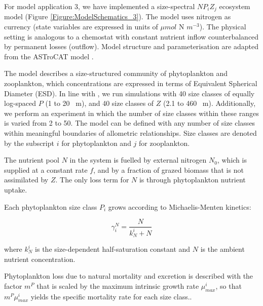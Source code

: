\documentclass[journal abbreviation, manuscript]{copernicus}
\begin{document}
For model application 3, we have implemented a size-spectral $NP_{i}Z_{j}$ ecosystem model (Figure \ref{Figure:ModelSchematics_3}). The model uses nitrogen as currency (state variables are expressed in units of $\mu mol$ N $m^{-3}$). The physical setting is analogous to a chemostat with constant nutrient inflow counterbalanced by permanent losses (outflow). Model structure and parameterisation are adapted from the ASTroCAT model \citep{Banas2011b}.

The model describes a size-structured community of phytoplankton and zooplankton, which concentrations are expressed in terms of Equivalent Spherical Diameter (ESD). In line with \citet{Banas2011b}, we run simulations with 40 size classes of equally log-spaced $P$ (1 to 20 \unit{\mu m}), and 40 size classes of $Z$ (2.1 to 460  \unit{\mu m}). Additionally, we perform an experiment in which the number of size classes within these ranges is varied from 2 to 50. The model can be defined with any number of size classes within meaningful boundaries of allometric relationships. Size classes are denoted by the subscript $i$ for phytoplankton and $j$ for zooplankton.

The nutrient pool $N$ in the system is fuelled by external nitrogen $N_0$, which is supplied at a constant rate $f$, and by a fraction of grazed biomass that is not assimilated by $Z$. The only loss term for $N$ is through phytoplankton nutrient uptake.

Each phytoplankton size class $P_i$ grows according to Michaelis-Menten kinetics:

\begin{equation}
    \gamma_i^N =  \frac{N}{k_N^i + N} 
\end{equation}

where $k_N^i$ is the size-dependent half-saturation constant and $N$ is the ambient nutrient concentration.

Phytoplankton loss due to natural mortality and excretion is described with the factor $m^P$ that is scaled by the maximum intrinsic growth rate $\mu_{max}^i$, so that $m^P \mu_{max}^i$ yields the specific mortality rate for each size class..
\end{document}
